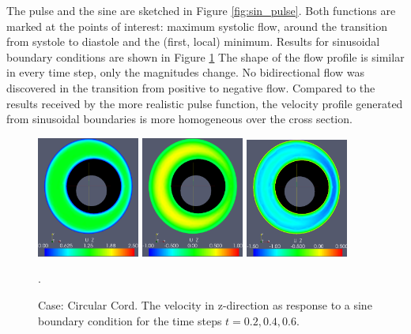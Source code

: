 The pulse and the sine are sketched in Figure \ref{fig:sin_pulse}. Both functions are marked at the points of interest: maximum systolic flow, around the transition from systole to diastole and the (first, local) minimum. Results for sinusoidal boundary conditions are shown in Figure \ref{fig:case2} The shape of the flow profile is similar in every time step, only the magnitudes change. No bidirectional flow was discovered in the transition from positive to negative flow. Compared to the results received by the more realistic pulse function, the velocity profile generated from sinusoidal boundaries is more homogeneous over the cross section. 




\begin{figure}\begin{center}
\includegraphics[width=0.3\textwidth]{chapters/haughton/eps/sin_sysmax_nmb2.eps}
\includegraphics[width=0.3\textwidth]{chapters/haughton/eps/sin_sysdia_nmb4.eps}
\includegraphics[width=0.3\textwidth]{chapters/haughton/eps/sin_diamin_nmb6.eps}
\caption{Case: Circular Cord. The velocity in z-direction as response to a sine boundary condition for the time steps $t=0.2, 0.4, 0.6$.}
\label{fig:case2}. 
\end{center}\end{figure}





